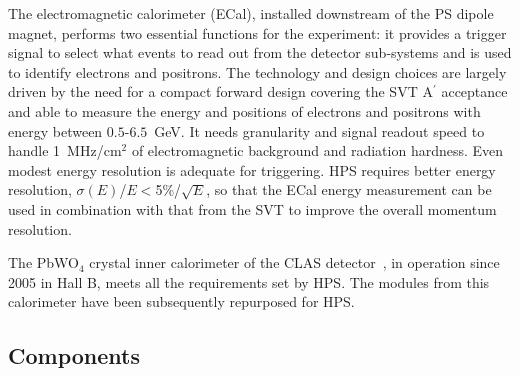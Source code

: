 \documentclass[final,3p,times,twocolumn]{elsarticle}
\newcommand{\Aprime}{A\ensuremath{^\prime}}
\begin{document}
The electromagnetic calorimeter (ECal), installed downstream of the PS dipole magnet, performs two 
essential functions for the experiment: it provides a trigger signal to select what events to read out from 
the detector sub-systems and is used to identify electrons and positrons. 
The technology and design choices are largely driven by the need for a compact forward design 
covering the SVT \Aprime{} 
acceptance and able to measure the energy and positions of electrons and positrons with energy between
$0.5$-$6.5$~GeV. It needs granularity and signal 
readout speed to handle 1~MHz/cm$^{2}$ of electromagnetic background and radiation hardness. 
Even modest energy resolution is adequate for triggering. HPS requires better 
energy resolution, $\sigma(E)$/$E$$<$5\%/$\sqrt{E}$, so that the ECal energy measurement can be used in 
combination with that from the SVT to improve the overall momentum resolution.

The PbWO$_{4}$ crystal inner calorimeter of the CLAS detector~\cite{clas_ecal,clas_ecal2,clas_thesis}, in 
operation since 2005 in Hall B, meets all the requirements set by HPS. The modules from this calorimeter have been subsequently 
repurposed for HPS. 


\subsection{Components}
\end{document}
